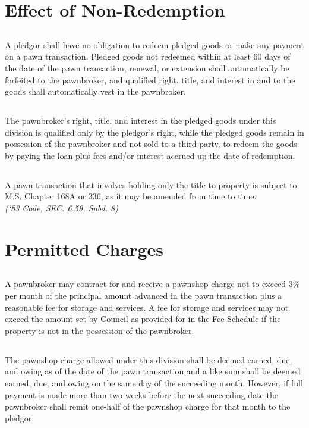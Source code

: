 \section{Effect of Non-Redemption}
\subsection{}
A pledgor shall have no obligation to redeem pledged goods or make any payment on a pawn transaction.  Pledged goods not redeemed within at least 60 days of the date of the pawn transaction, renewal, or extension shall automatically be forfeited to the pawnbroker, and qualified right, title, and interest in and to the goods shall automatically vest in the pawnbroker.
\subsection{}
The pawnbroker’s right, title, and interest in the pledged goods under this division is qualified only by the pledgor’s right, while the pledged goods remain in possession of the pawnbroker and not sold to a third party, to redeem the goods by paying the loan plus fees and/or interest accrued up the date of redemption.
\subsection{}
A pawn transaction that involves holding only the title to property is subject to M.S. Chapter 168A or 336, as it may be amended from time to time.\\
\emph{(‘83 Code, SEC. 6.59, Subd. 8)}
\section{Permitted Charges}
\subsection{}
A pawnbroker may contract for and receive a pawnshop charge not to exceed 3\% per month of the principal amount advanced in the pawn transaction plus a reasonable fee for storage and services.  A fee for storage and services may not exceed the amount set by Council as provided for in the Fee Schedule if the property is not in the possession of the pawnbroker.
\subsection{}
The pawnshop charge allowed under this division shall be deemed earned, due, and owing as of the date of the pawn transaction and a like sum shall be deemed earned, due, and owing on the same day of the succeeding month.  However, if full payment is made more than two weeks before the next succeeding date the pawnbroker shall remit one-half of the pawnshop charge for that month to the pledgor.
